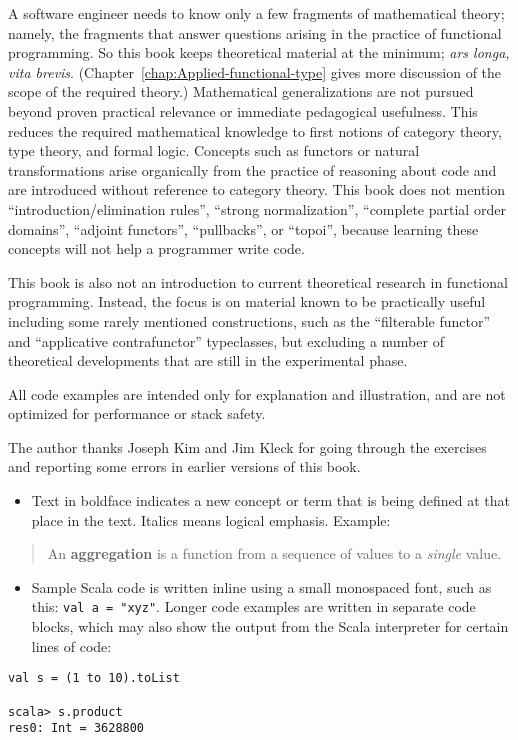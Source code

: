 A software engineer needs to know only a few fragments of mathematical
theory; namely, the fragments that answer questions arising in the
practice of functional programming. So this book keeps theoretical
material at the minimum; \emph{ars longa, vita brevis}. (Chapter~\ref{chap:Applied-functional-type}
gives more discussion of the scope of the required theory.) Mathematical
generalizations are not pursued beyond proven practical relevance
or immediate pedagogical usefulness. This reduces the required mathematical
knowledge to first notions of category theory, type theory, and formal
logic. Concepts such as functors or natural transformations arise
organically from the practice of reasoning about code and are introduced
without reference to category theory. This book does not mention ``introduction/elimination
rules'', ``strong normalization'', ``complete partial order domains'',
``adjoint functors'', ``pullbacks'', or ``topoi'', because learning
these concepts will not help a programmer write code. 

This book is also not an introduction to current theoretical research
in functional programming. Instead, the focus is on material known
to be practically useful \textemdash{} including some rarely mentioned
constructions, such as the ``filterable functor'' and ``applicative
contrafunctor'' typeclasses, but excluding a number of theoretical
developments that are still in the experimental phase.

All code examples are intended only for explanation and illustration,
and are not optimized for performance or stack safety.

The author thanks Joseph Kim and Jim Kleck for going through the exercises
and reporting some errors in earlier versions of this book.

\begin{itemize}
\item Text in boldface indicates a new concept or term that is being defined
at that place in the text. Italics means logical emphasis. Example:
\end{itemize}
\begin{quotation}
An \textbf{aggregation} is a function from a sequence
of values to a \emph{single} value.
\end{quotation}
\begin{itemize}
\item Sample Scala code is written inline using a small monospaced font,
such as this: \lstinline!val a = "xyz"!. Longer code examples are
written in separate code blocks, which may also show the output from
the Scala interpreter for certain lines of code:
\end{itemize}
\begin{lstlisting}[mathescape=true]
val s = (1 to 10).toList

scala> s.product
res0: Int = 3628800 
\end{lstlisting}

